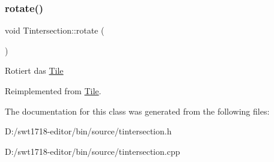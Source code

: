 \subsubsection{\texorpdfstring{rotate()}{rotate()}}
{\footnotesize\ttfamily void Tintersection\+::rotate (\begin{DoxyParamCaption}{ }\end{DoxyParamCaption})\hspace{0.3cm}{\ttfamily [virtual]}}

Rotiert das \mbox{\hyperlink{class_tile}{Tile}} 

Reimplemented from \mbox{\hyperlink{class_tile_a15c3d8260c8950d3461e3ba2849cd141}{Tile}}.



The documentation for this class was generated from the following files\+:\begin{DoxyCompactItemize}
\item 
D\+:/swt1718-\/editor/bin/source/tintersection.\+h\item 
D\+:/swt1718-\/editor/bin/source/tintersection.\+cpp\end{DoxyCompactItemize}
